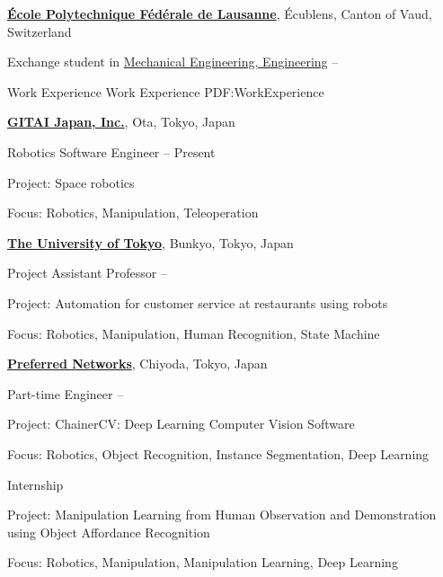 \documentclass[letterpaper,MMMyyyy,nonstopmode]{simpleresumecv}
\begin{document}
\begin{Body}
\Gap
\Entry
\href{https://www.epfl.ch/en/}
{\textbf{École Polytechnique Fédérale de Lausanne}},
Écublens, Canton of Vaud, Switzerland
\Gap

\Gap
Exchange student in
\href{http://www.t.u-tokyo.ac.jp/en/foe}
{Mechanical Engineering, Engineering}
\hfill
{} --


\Section
{Work Experience}
{Work Experience}
{PDF:WorkExperience}

\Gap
\Entry
\href{https://gitai.tech/}
{\textbf{GITAI Japan, Inc.}},
Ota, Tokyo, Japan
\Gap


\Gap
Robotics Software Engineer
\hfill
{} --
Present
\begin{Detail}
Project:
Space robotics
\par
Focus:
Robotics, Manipulation, Teleoperation
\end{Detail}
\Gap

\Gap
\Entry
\href{https://www.u-tokyo.ac.jp/en/}
{\textbf{The University of Tokyo}},
Bunkyo, Tokyo, Japan
\Gap

\Gap
Project Assistant Professor
\hfill
{} --
\begin{Detail}
Project:
Automation for customer service at restaurants using robots
\par
Focus:
Robotics, Manipulation, Human Recognition, State Machine
\end{Detail}
\Gap

\Gap
\Entry
\href{https://www.preferred.jp/en/}
{\textbf{Preferred Networks}},
Chiyoda, Tokyo, Japan
\Gap

\Gap
Part-time Engineer
\hfill
{} --
\begin{Detail}
Project:
ChainerCV: Deep Learning Computer Vision Software
\par
Focus:
Robotics, Object Recognition, Instance Segmentation, Deep Learning 
\end{Detail}
\Gap

\Gap
Internship
\hfill
{}
\begin{Detail}
Project:
Manipulation Learning from Human Observation and Demonstration using Object Affordance Recognition
\par
Focus:
Robotics, Manipulation, Manipulation Learning, Deep Learning
\end{Detail}
\Gap


\end{Body}
\end{document}
